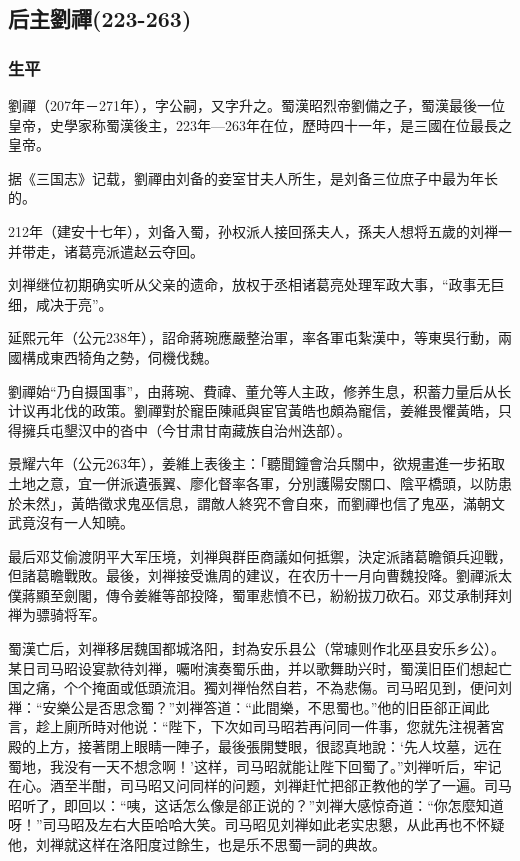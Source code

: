 
\subsection{后主劉禪\tiny(223-263)}

\subsubsection{生平}

劉禪（207年－271年），字公嗣，又字升之。蜀漢昭烈帝劉備之子，蜀漢最後一位皇帝，史學家称蜀漢後主，223年—263年在位，歷時四十一年，是三國在位最長之皇帝。

据《三国志》记载，劉禪由刘备的妾室甘夫人所生，是刘备三位庶子中最为年长的。

212年（建安十七年），刘备入蜀，孙权派人接回孫夫人，孫夫人想将五歲的刘禅一并带走，诸葛亮派遣赵云夺回。

刘禅继位初期确实听从父亲的遗命，放权于丞相诸葛亮处理军政大事，“政事无巨细，咸决于亮”。

延熙元年（公元238年），詔命蔣琬應嚴整治軍，率各軍屯紮漢中，等東吳行動，兩國構成東西犄角之勢，伺機伐魏。

劉禪始“乃自摄国事”，由蔣琬、費禕、董允等人主政，修养生息，积蓄力量后从长计议再北伐的政策。劉禪對於寵臣陳祗與宦官黃皓也頗為寵信，姜維畏懼黃皓，只得擁兵屯墾汉中的沓中（今甘肃甘南藏族自治州迭部）。

景耀六年（公元263年），姜維上表後主：「聽聞鐘會治兵關中，欲規畫進一步拓取土地之意，宜一併派遺張翼、廖化督率各軍，分別護陽安關口、陰平橋頭，以防患於未然」，黃皓徵求鬼巫信息，謂敵人終究不會自來，而劉禪也信了鬼巫，滿朝文武竟沒有一人知曉。

最后邓艾偷渡阴平大军压境，刘禅與群臣商議如何抵禦，決定派諸葛瞻領兵迎戰，但諸葛瞻戰敗。最後，刘禅接受谯周的建议，在农历十一月向曹魏投降。劉禪派太僕蔣顯至劍閣，傳令姜維等部投降，蜀軍悲憤不已，紛紛拔刀砍石。邓艾承制拜刘禅为骠骑将军。

蜀漢亡后，刘禅移居魏国都城洛阳，封為安乐县公（常璩则作北巫县安乐乡公）。某日司马昭设宴款待刘禅，囑咐演奏蜀乐曲，并以歌舞助兴时，蜀漢旧臣们想起亡国之痛，个个掩面或低頭流泪。獨刘禅怡然自若，不為悲傷。司马昭见到，便问刘禅：“安樂公是否思念蜀？”刘禅答道：“此間樂，不思蜀也。”他的旧臣郤正闻此言，趁上廁所時对他说：“陛下，下次如司马昭若再问同一件事，您就先注視著宮殿的上方，接著閉上眼睛一陣子，最後張開雙眼，很認真地說：‘先人坟墓，远在蜀地，我没有一天不想念啊！’这样，司马昭就能让陛下回蜀了。”刘禅听后，牢记在心。酒至半酣，司马昭又问同样的问题，刘禅赶忙把郤正教他的学了一遍。司马昭听了，即回以：“咦，这话怎么像是郤正说的？”刘禅大感惊奇道：“你怎麼知道呀！”司马昭及左右大臣哈哈大笑。司马昭见刘禅如此老实忠懇，从此再也不怀疑他，刘禅就这样在洛阳度过餘生，也是乐不思蜀一詞的典故。


